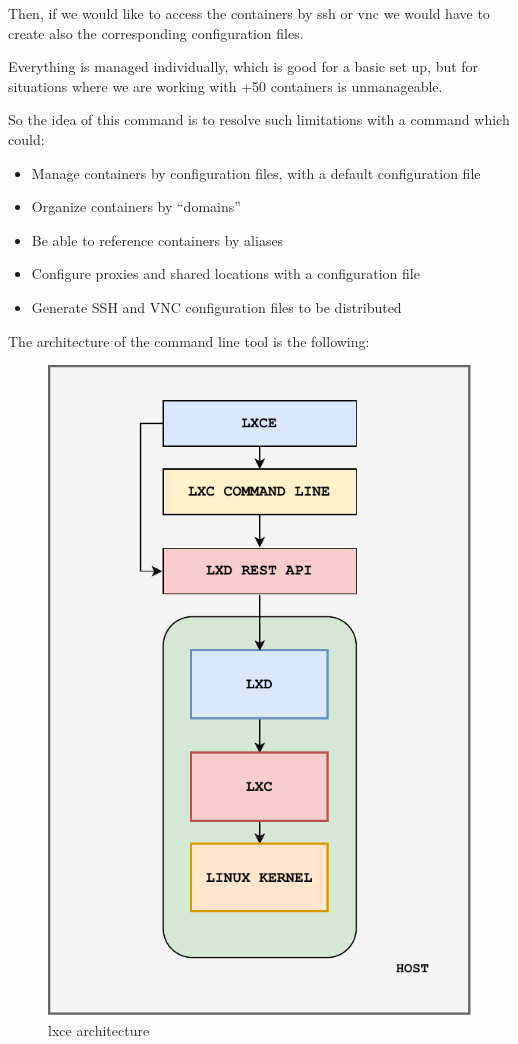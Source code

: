 Then, if we would like to access the containers by ssh or vnc we would have to create also the corresponding configuration files.

Everything is managed individually, which is good for a basic set up, but for situations where we are working with +50 containers is unmanageable. 

So the idea of this command is to resolve such limitations with a command which could:
\begin{itemize}
	\item{Manage containers by configuration files, with a default configuration file}
	\item{Organize containers by ``domains''}
	\item{Be able to reference containers by aliases}
	\item{Configure proxies and shared locations with a configuration file}
	\item{Generate SSH and VNC configuration files to be distributed}
\end{itemize}

The architecture of the command line tool is the following:
\begin{figure}[H]
	\label{fig:lxce architecture}
	\centering
	\includegraphics{img/03/lxce-diagram.pdf}
	\caption[lxce architecture]{\footnotesize{lxce architecture}}
\end{figure}

